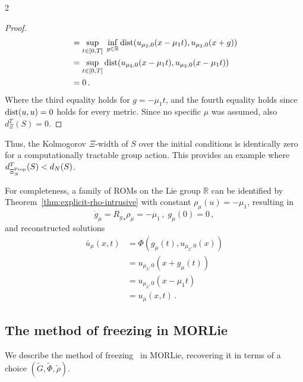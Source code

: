 \documentclass{article}
\newtheorem{proof}{Proof}[theorem]
\newcommand{\R}{\mathbb{R}}                                 %
\begin{document}
\begin{multicols}{2}
\begin{proof}
\begin{align}
        &= \sup_{t\in[0,T]}\; \inf_{g\in \R} \textnormal{dist}(u_{\mu_2,0}(x-\mu_1 t),u_{\mu_2,0}(x+g))\nonumber\\
        &= \sup_{t\in[0,T]} \textnormal{dist}(u_{\mu_2,0}(x-\mu_1 t),u_{\mu_2,0}(x-\mu_1 t)) \nonumber\\
        &= 0\,.\nonumber
    \end{align}
    Where the third equality holds for $g = -\mu_1 t$, and the fourth equality holds since $\textnormal{dist}(u,u) = 0$ holds for every metric. Since no specific $\mu$ was assumed, also $d^T_{\Xi}(S) = 0$.
\end{proof}
Thus, the Kolmogorov $\Xi$-width of $S$ over the initial conditions is identically zero for a computationally tractable group action. This provides an example where $d^T_{\Xi_N^{\textnormal{Prop}}}(S) < d_N(S)$. 

For completeness, a family of ROMs on the Lie group $\R$ can be identified by Theorem~\eqref{thm:explicit-rho-intrusive} with constant $\rho_\mu(u) = -\mu_1$, resulting in
\begin{equation}
    \dot{g}_\mu = {R_g}_*\rho_\mu = -\mu_1\,,\; g_\mu(0) = 0\,,    
\end{equation}
and reconstructed solutions
\begin{align}
    \bar{u}_\mu(x,t) &= \Phi(g_\mu(t),u_{\mu_2,0}(x)) \\ 
    &= u_{\mu_2,0}(x + g_\mu(t))  \nonumber \\
    &= u_{\mu_2,0}(x - \mu_1 t)  \nonumber \\
    & = u_\mu(x,t) \,. \nonumber
\end{align}
 


\subsection{The method of freezing in MORLie}\label{ssec:method_of_freezing}
We describe the method of freezing~\cite{Ohlberger2013} in MORLie, recovering it in terms of a choice $(\widetilde{G},\widetilde{\Phi},\widetilde{\rho})$. 


\end{multicols}
\end{document}
